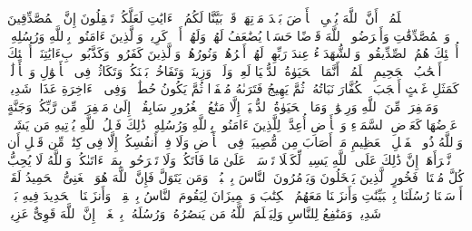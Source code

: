 ٱعۡلَمُوۤا۟ أَنَّ ٱللَّهَ یُحۡیِ ٱلۡأَرۡضَ بَعۡدَ مَوۡتِهَاۚ قَدۡ بَیَّنَّا لَكُمُ ٱلۡءَایَٰتِ لَعَلَّكُمۡ تَعۡقِلُونَ%
\stopbuffer%
\startbuffer[\q:57:18]
إِنَّ ٱلۡمُصَّدِّقِینَ وَٱلۡمُصَّدِّقَٰتِ وَأَقۡرَضُوا۟ ٱللَّهَ قَرۡضًا حَسَنࣰا یُضَٰعَفُ لَهُمۡ وَلَهُمۡ أَجۡرࣱ كَرِیمࣱ%
\stopbuffer%
\startbuffer[\q:57:19]
وَٱلَّذِینَ ءَامَنُوا۟ بِٱللَّهِ وَرُسُلِهِۦۤ أُو۟لَٰۤئِكَ هُمُ ٱلصِّدِّیقُونَۖ وَٱلشُّهَدَاۤءُ عِندَ رَبِّهِمۡ لَهُمۡ أَجۡرُهُمۡ وَنُورُهُمۡۖ وَٱلَّذِینَ كَفَرُوا۟ وَكَذَّبُوا۟ بِءَایَٰتِنَاۤ أُو۟لَٰۤئِكَ أَصۡحَٰبُ ٱلۡجَحِیمِ%
\stopbuffer%
\startbuffer[\q:57:20]
ٱعۡلَمُوۤا۟ أَنَّمَا ٱلۡحَیَوٰةُ ٱلدُّنۡیَا لَعِبࣱ وَلَهۡوࣱ وَزِینَةࣱ وَتَفَاخُرُۢ بَیۡنَكُمۡ وَتَكَاثُرࣱ فِی ٱلۡأَمۡوَٰلِ وَٱلۡأَوۡلَٰدِۖ كَمَثَلِ غَیۡثٍ أَعۡجَبَ ٱلۡكُفَّارَ نَبَاتُهُۥ ثُمَّ یَهِیجُ فَتَرَىٰهُ مُصۡفَرࣰّا ثُمَّ یَكُونُ حُطَٰمࣰاۖ وَفِی ٱلۡءَاخِرَةِ عَذَابࣱ شَدِیدࣱ وَمَغۡفِرَةࣱ مِّنَ ٱللَّهِ وَرِضۡوَٰنࣱۚ وَمَا ٱلۡحَیَوٰةُ ٱلدُّنۡیَاۤ إِلَّا مَتَٰعُ ٱلۡغُرُورِ%
\stopbuffer%
\startbuffer[\q:57:21]
سَابِقُوۤا۟ إِلَىٰ مَغۡفِرَةࣲ مِّن رَّبِّكُمۡ وَجَنَّةٍ عَرۡضُهَا كَعَرۡضِ ٱلسَّمَاۤءِ وَٱلۡأَرۡضِ أُعِدَّتۡ لِلَّذِینَ ءَامَنُوا۟ بِٱللَّهِ وَرُسُلِهِۦۚ ذَٰلِكَ فَضۡلُ ٱللَّهِ یُؤۡتِیهِ مَن یَشَاۤءُۚ وَٱللَّهُ ذُو ٱلۡفَضۡلِ ٱلۡعَظِیمِ%
\stopbuffer%
\startbuffer[\q:57:22]
مَاۤ أَصَابَ مِن مُّصِیبَةࣲ فِی ٱلۡأَرۡضِ وَلَا فِیۤ أَنفُسِكُمۡ إِلَّا فِی كِتَٰبࣲ مِّن قَبۡلِ أَن نَّبۡرَأَهَاۤۚ إِنَّ ذَٰلِكَ عَلَى ٱللَّهِ یَسِیرࣱ%
\stopbuffer%
\startbuffer[\q:57:23]
لِّكَیۡلَا تَأۡسَوۡا۟ عَلَىٰ مَا فَاتَكُمۡ وَلَا تَفۡرَحُوا۟ بِمَاۤ ءَاتَىٰكُمۡۗ وَٱللَّهُ لَا یُحِبُّ كُلَّ مُخۡتَالࣲ فَخُورٍ%
\stopbuffer%
\startbuffer[\q:57:24]
ٱلَّذِینَ یَبۡخَلُونَ وَیَأۡمُرُونَ ٱلنَّاسَ بِٱلۡبُخۡلِۗ وَمَن یَتَوَلَّ فَإِنَّ ٱللَّهَ هُوَ ٱلۡغَنِیُّ ٱلۡحَمِیدُ%
\stopbuffer%
\startbuffer[\q:57:25]
لَقَدۡ أَرۡسَلۡنَا رُسُلَنَا بِٱلۡبَیِّنَٰتِ وَأَنزَلۡنَا مَعَهُمُ ٱلۡكِتَٰبَ وَٱلۡمِیزَانَ لِیَقُومَ ٱلنَّاسُ بِٱلۡقِسۡطِۖ وَأَنزَلۡنَا ٱلۡحَدِیدَ فِیهِ بَأۡسࣱ شَدِیدࣱ وَمَنَٰفِعُ لِلنَّاسِ وَلِیَعۡلَمَ ٱللَّهُ مَن یَنصُرُهُۥ وَرُسُلَهُۥ بِٱلۡغَیۡبِۚ إِنَّ ٱللَّهَ قَوِیٌّ عَزِیزࣱ%
\stopbuffer%
